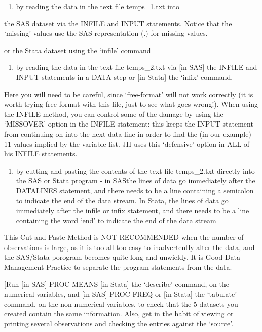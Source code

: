 \documentclass[]{book}
\providecommand{\tightlist}{%
  \setlength{\itemsep}{0pt}\setlength{\parskip}{0pt}}
\begin{document}
\begin{enumerate}
\def\labelenumi{(\roman{enumi})}
\setcounter{enumi}{2}
\tightlist
\item
  by reading the data in the text file temps\_1.txt into
\end{enumerate}

the SAS dataset via the INFILE and INPUT statements. Notice that the `missing' values use the SAS representation (.) for missing values.

or the Stata dataset using the `infile' command

\begin{enumerate}
\def\labelenumi{(\roman{enumi})}
\setcounter{enumi}{3}
\tightlist
\item
  by reading the data in the text file temps\_2.txt via {[}in SAS{]} the INFILE and INPUT statements in a DATA step or {[}in Stata{]} the `infix' command.
\end{enumerate}

Here you will need to be careful, since `free-format' will not work correctly (it is worth trying free format with this file, just to see what goes wrong!). When using the INFILE method, you can control some of the damage by using the `MISSOVER' option in the INFILE statement: this keeps the INPUT statement from continuing on into the next data line in order to find the (in our example) 11 values implied by the variable list. JH uses this `defensive' option in ALL of his INFILE statements.

\begin{enumerate}
\def\labelenumi{(\alph{enumi})}
\setcounter{enumi}{21}
\tightlist
\item
  by cutting and pasting the contents of the text file temps\_2.txt directly into the SAS or Stata program - in SASthe lines of data go immediately after the DATALINES statement, and there needs to be a line containing a semicolon to indicate the end of the data stream. In Stata, the lines of data go immediately after the infile or infix statement, and there needs to be a line containing the word `end' to indicate the end of the data stream
\end{enumerate}

This Cut and Paste Method is NOT RECOMMENDED when the number of observations is large, as it is too all too easy to inadvertently alter the data, and the SAS/Stata porogram becomes quite long and unwieldy. It is Good Data Management Practice to separate the program statements from the data.

{[}Run {[}in SAS{]} PROC MEANS {[}in Stata{]} the `describe' command, on the numerical variables, and {[}in SAS{]} PROC FREQ or {[}in Stata{]} the `tabulate' command, on the non-numerical variables, to check that the 5 datasets you created contain the same information. Also, get in the habit of viewing or printing several observations and checking the entries against the `source'.
\end{document}
